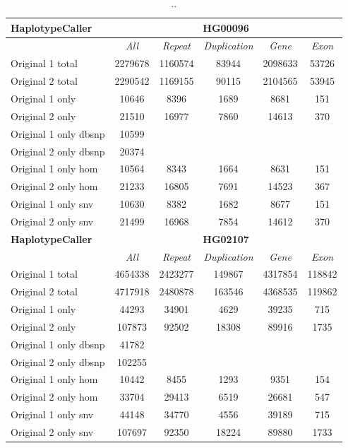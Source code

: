 \begin{table}[htb]
\begin{center}
\begin{tabular}{|l|c||c|c|c|c|}
\hline
{\bf HaplotypeCaller} & \multicolumn{5}{|c|}{\bf HG00096} \\
\hline
\cline{2-6}
{\bf} & {\it All} & {\it Repeat} & {\it Duplication} & {\it Gene} & {\it Exon} \\
\hline
Original 1 total & 2279678 & 1160574 & 83944 & 2098633 & 53726\\
\hline
Original 2 total & 2290542 & 1169155 & 90115 & 2104565 & 53945\\
\hline
Original 1 only & 10646 & 8396 & 1689 & 8681 & 151\\
\hline 
Original 2 only & 21510 & 16977 & 7860 & 14613 & 370\\
\hline 
Original 1 only dbsnp & 10599 &  &  &  & \\
\hline 
Original 2 only dbsnp & 20374 &  &  &  & \\
\hline 
Original 1 only hom & 10564 & 8343 & 1664 & 8631 & 151\\
\hline 
Original 2 only hom & 21233 & 16805 & 7691 & 14523 & 367\\
\hline 
Original 1 only snv & 10630 & 8382 & 1682 & 8677 & 151\\
\hline 
Original 2 only snv & 21499 & 16968 & 7854 & 14612 & 370\\
\hline
\hline
{\bf HaplotypeCaller} & \multicolumn{5}{|c|}{\bf HG02107} \\
\hline
\cline{2-6}
{\bf} & {\it All} & {\it Repeat} & {\it Duplication} & {\it Gene} & {\it Exon} \\
\hline
Original 1 total & 4654338 & 2423277 & 149867 & 4317854 & 118842\\ 
\hline
Original 2 total & 4717918 & 2480878 & 163546 & 4368535 & 119862\\ 
\hline
Original 1 only & 44293 & 34901 & 4629 & 39235 & 715\\
\hline 
Original 2 only & 107873 & 92502 & 18308 & 89916 & 1735\\
\hline 
Original 1 only dbsnp & 41782 &  &  &  & \\
\hline 
Original 2 only dbsnp & 102255 &  &  &  & \\
\hline 
Original 1 only hom & 10442 & 8455 & 1293 & 9351 & 154\\
\hline 
Original 2 only hom & 33704 & 29413 & 6519 & 26681 & 547\\
\hline 
Original 1 only snv & 44148 & 34770 & 4556 & 39189 & 715\\
\hline 
Original 2 only snv & 107697 & 92350 & 18224 & 89880 & 1733\\
\hline 
\end{tabular}
\end{center}
\caption{ .. }
\label{tab:orig-vs-orig2-hc}
\end{table}

